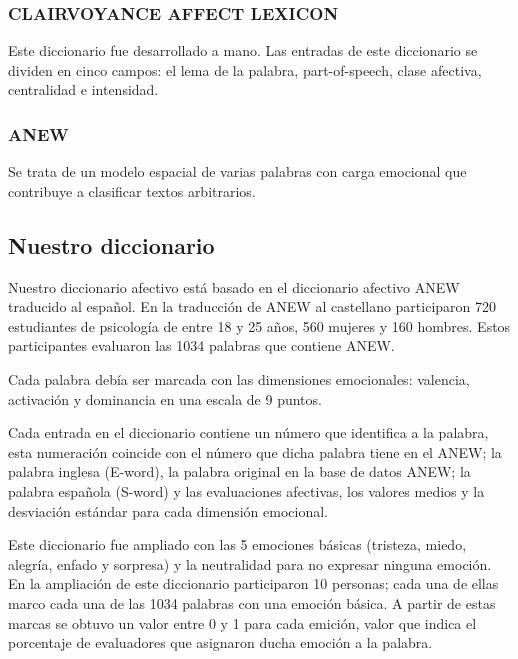 \subsubsection{CLAIRVOYANCE AFFECT LEXICON}

	Este diccionario fue desarrollado a mano. Las entradas de este diccionario se dividen en cinco campos: el lema de la palabra, part-of-speech, clase afectiva, centralidad e intensidad.
	
	\subsubsection{ANEW}
	Se trata de un modelo espacial de varias palabras con carga emocional que contribuye a clasificar textos arbitrarios.
	
	\subsection{Nuestro diccionario}
	\label{cap2:subsec:nuestro_diccionario}
	
	Nuestro diccionario afectivo está basado en el diccionario afectivo ANEW traducido al español.
	En la traducción de ANEW al castellano participaron 720 estudiantes de psicología de entre 18 y 25 años, 560 mujeres y 160 hombres.	Estos participantes evaluaron las 1034 palabras que contiene ANEW. 
	
	Cada palabra debía ser marcada con las dimensiones emocionales: valencia, activación y dominancia en una escala de 9 puntos.

Cada entrada en el diccionario contiene un número que identifica a la palabra, esta numeración coincide con el número que dicha palabra tiene en el ANEW; la palabra inglesa (E-word), la palabra original en la base de datos ANEW; la palabra española (S-word) y las evaluaciones afectivas, los valores medios y la desviación estándar para cada dimensión emocional.

Este diccionario fue ampliado con las 5 emociones básicas (tristeza, miedo, alegría, enfado y sorpresa) y la neutralidad para no expresar ninguna emoción. En la ampliación de este diccionario participaron 10 personas; cada una de ellas marco cada una de las 1034 palabras con una emoción básica. A partir de estas marcas se obtuvo un valor entre 0 y 1 para cada emición, valor que indica el porcentaje de evaluadores que asignaron ducha emoción a la palabra.

	
